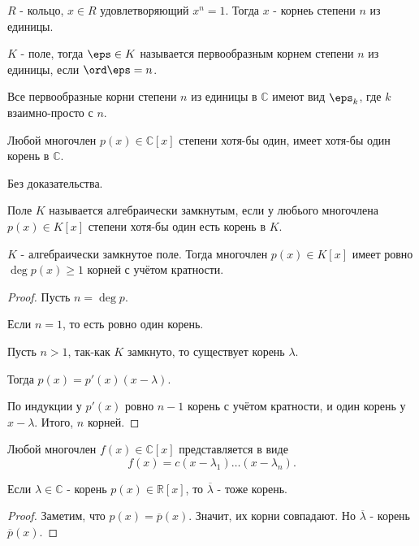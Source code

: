 \begin{definition} 
    $R$ - кольцо, $x\in R$ удовлетворяющий $x^{n} = 1$. Тогда $x$ - корнеь степени $n$ из единицы.
\end{definition}
\begin{definition} 
    $K$ - поле, тогда $\eps\in K$ называется первообразным корнем степени $n$ из единицы, если $\ord \eps = n$.
\end{definition}
\begin{remark} 
    Все первообразные корни степени $n$ из единицы в $\mathbb{C}$ имеют вид $\eps_k$, где $k$ взаимно-просто с $n$.
\end{remark}
\begin{theorem} 
    Любой многочлен $p(x)\in \mathbb{C}[x]$ степени хотя-бы один, имеет хотя-бы один корень в $\mathbb{C}$.

    Без доказательства.
\end{theorem}
\begin{definition} 
    Поле $K$ называется алгебраически замкнутым, если у любього многочлена $p(x)\in K[x]$ степени хотя-бы один есть корень в $K$.
\end{definition}
\begin{lemma} 
    $K$ - алгебраически замкнутое поле. Тогда многочлен $p(x)\in K[x]$ имеет ровно $\deg p(x)\ge 1$ корней с учётом кратности.
    \begin{proof}
        Пусть $n=\deg p$.

        Если $n=1$, то есть ровно один корень.

        Пусть $n>1$, так-как $K$ замкнуто, то существует корень $\lambda$.

        Тогда $p(x) = p'(x)(x-\lambda)$.

        По индукции у $p'(x)$ ровно $n-1$ корень с учётом кратности, и один корень у $x-\lambda$. Итого, $n$ корней.
    \end{proof}
\end{lemma}
\begin{remark} 
    Любой многочлен $f(x)\in \mathbb{C}[x]$ представляется в виде
    \[ f(x) = c(x-\lambda_1)\ldots\left( x-\lambda_n \right)  .\] 
\end{remark}
\begin{lemma} 
    Если $\lambda\in \mathbb{C}$ - корень $p(x)\in \mathbb{R}[x]$, то $\overline{\lambda}$ - тоже корень.
    \begin{proof}
        Заметим, что $p(x) = \overline{p}(x)$. Значит, их корни совпадают. Но $\overline{\lambda}$ - корень $\overline{p}(x)$.
    \end{proof}
\end{lemma}
